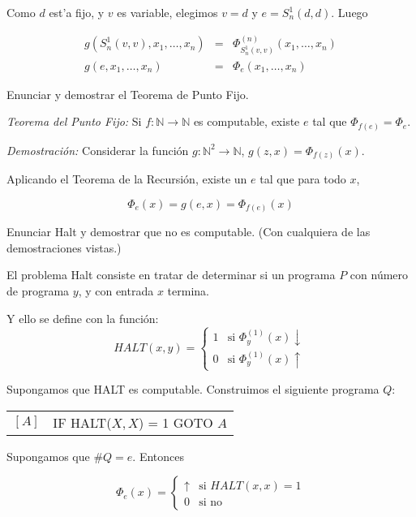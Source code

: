 \begin{questions}
\begin{solution}
  Como $d$ est'a fijo, y $v$ es variable, elegimos $v = d$ y $e = S_n^1(d,d)$. Luego

  \begin{eqnarray*}
  g(S_n^1(v,v), x_1, \dots, x_n) &=& \Phi_{S_n^1(v,v)}^{(n)}(x_1, \dots, x_n) \\
	    g(e, x_1, \dots, x_n) &=& \Phi_e(x_1, \dots, x_n)
  \end{eqnarray*}
\end{solution}

\question Enunciar y demostrar el Teorema de Punto Fijo.

\begin{solution}

 {\it Teorema del Punto Fijo: } Si $f : \mathbb{N}\rightarrow\mathbb{N}$ es computable, existe $e$ tal que $\Phi_{f(e)}=\Phi_e$.
 
 {\it Demostraci\'on: } Considerar la funci\'on $g : \mathbb{N}^2\rightarrow\mathbb{N}$, $g(z,x) = \Phi_{f(z)}(x)$.
 
 Aplicando el Teorema de la Recursi\'on, existe un $e$ tal que para todo $x$, 
 
 \begin{equation*}
  \Phi_e(x)=g(e,x)=\Phi_{f(e)}(x)
 \end{equation*}

\end{solution}

\question Enunciar Halt y demostrar que no es computable. (Con cualquiera de las demostraciones vistas.)

\begin{solution}

El problema Halt consiste en tratar de determinar si un programa $P$ con n\'umero de programa $y$, y con entrada $x$ termina. 

Y ello se define con la funci\'on: 
$$
HALT(x,y) = \left\{
\begin{array}{cl}
1 & \mbox{si } \Phi_y^{(1)}(x)\downarrow \\
0 & \mbox{si } \Phi_y^{(1)}(x)\uparrow
\end{array}\right.
$$

Supongamos que HALT es computable. Construimos el siguiente programa $Q$: 

\begin{tabular}{rl}
  $[A]$ & IF HALT($X,X$) = 1 GOTO $A$ 
\end{tabular}

Supongamos que $\#Q=e$. Entonces

$$
\Phi_e(x) = \left\{
\begin{array}{cl}
\uparrow & \mbox{si } HALT(x,x)=1 \\
0 & \mbox{si no} 
\end{array}\right.
$$


\end{solution}
\end{questions}

